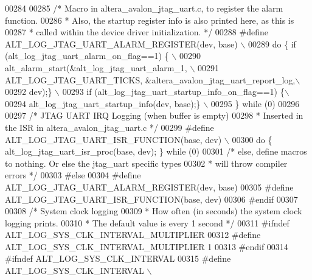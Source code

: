 \begin{DoxyCode}
{{{{00284 
00285         \textcolor{comment}{/* Macro in altera\_avalon\_jtag\_uart.c, to register the alarm function.}
00286 \textcolor{comment}{         * Also, the startup register info is also printed here, as this is}
00287 \textcolor{comment}{         * called within the device driver initialization.  */}
00288 \textcolor{preprocessor}{        #define ALT\_LOG\_JTAG\_UART\_ALARM\_REGISTER(dev, base) \(\backslash\)}
00289 \textcolor{preprocessor}{            do \{ if (alt\_log\_jtag\_uart\_alarm\_on\_flag==1) \{ \(\backslash\)}
00290 \textcolor{preprocessor}{                    alt\_alarm\_start(&alt\_log\_jtag\_uart\_alarm\_1, \(\backslash\)}
00291 \textcolor{preprocessor}{                    ALT\_LOG\_JTAG\_UART\_TICKS, &altera\_avalon\_jtag\_uart\_report\_log,\(\backslash\)}
00292 \textcolor{preprocessor}{                    dev);\} \(\backslash\)}
00293 \textcolor{preprocessor}{                 if (alt\_log\_jtag\_uart\_startup\_info\_on\_flag==1) \{\(\backslash\)}
00294 \textcolor{preprocessor}{                    alt\_log\_jtag\_uart\_startup\_info(dev, base);\} \(\backslash\)}
00295 \textcolor{preprocessor}{               \} while (0)}
00296   
00297         \textcolor{comment}{/* JTAG UART IRQ Logging (when buffer is empty) }
00298 \textcolor{comment}{         * Inserted in the ISR in altera\_avalon\_jtag\_uart.c */}
00299 \textcolor{preprocessor}{        #define ALT\_LOG\_JTAG\_UART\_ISR\_FUNCTION(base, dev) \(\backslash\)}
00300 \textcolor{preprocessor}{            do \{ alt\_log\_jtag\_uart\_isr\_proc(base, dev); \} while (0) }
00301     \textcolor{comment}{/* else, define macros to nothing.  Or else the jtag\_uart specific types}
00302 \textcolor{comment}{     * will throw compiler errors */}
00303 \textcolor{preprocessor}{    #else}
00304 \textcolor{preprocessor}{        #define ALT\_LOG\_JTAG\_UART\_ALARM\_REGISTER(dev, base) }
00305 \textcolor{preprocessor}{        #define ALT\_LOG\_JTAG\_UART\_ISR\_FUNCTION(base, dev) }
00306 \textcolor{preprocessor}{    #endif}
00307 
00308     \textcolor{comment}{/* System clock logging}
00309 \textcolor{comment}{     * How often (in seconds) the system clock logging prints.}
00310 \textcolor{comment}{     * The default value is every 1 second */}
00311 \textcolor{preprocessor}{    #ifndef ALT\_LOG\_SYS\_CLK\_INTERVAL\_MULTIPLIER}
00312 \textcolor{preprocessor}{    #define ALT\_LOG\_SYS\_CLK\_INTERVAL\_MULTIPLIER 1}
00313 \textcolor{preprocessor}{    #endif}
00314 \textcolor{preprocessor}{    #ifndef ALT\_LOG\_SYS\_CLK\_INTERVAL}
00315 \textcolor{preprocessor}{    #define ALT\_LOG\_SYS\_CLK\_INTERVAL \(\backslash\)}
}}}}
\end{DoxyCode}
